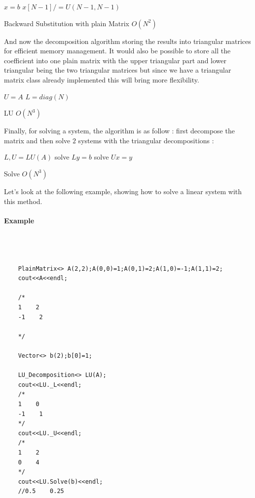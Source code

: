 \documentclass[a4paper]{report}
\begin{document}
\begin{algorithm}[H]
 $x=b$\;
 $x[N-1]/=U(N-1,N-1)$\;
 \caption{Backward Substitution with plain Matrix $O(N^2)$}
\end{algorithm}
And now the decomposition algorithm storing the results into triangular matrices for efficient memory management. It would also be possible to store all the coefficient into one plain matrix with the upper triangular part and lower triangular being the two triangular matrices but since we have a triangular matrix class already implemented this will bring more flexibility.
\\
\begin{algorithm}[H]
 $U=A$\;
 $L=diag(N)$\;
\caption{LU $O(N^3)$}
\end{algorithm}
Finally, for solving a system, the algorithm is as follow : first decompose the matrix and then solve $2$ systems with the triangular decompositions :
\begin{algorithm}[H]
 $L,U=LU(A)$\;
 solve $ Ly = b$\;
 solve $ Ux = y$\;
\caption{Solve $O(N^3)$}
\end{algorithm}
Let's look at the following example, showing how to solve a linear system with this method.
\paragraph{Example}
\begin{lstlisting}[basicstyle=\tiny]



    PlainMatrix<> A(2,2);A(0,0)=1;A(0,1)=2;A(1,0)=-1;A(1,1)=2;
    cout<<A<<endl;
   
    /*
    1    2
    -1    2
   
    */

    Vector<> b(2);b[0]=1;
   
    LU_Decomposition<> LU(A);
    cout<<LU._L<<endl;
    /*
    1    0
    -1    1
    */
    cout<<LU._U<<endl;
    /*
    1    2
    0    4
    */
    cout<<LU.Solve(b)<<endl;
    //0.5    0.25



\end{lstlisting}
\end{document}
